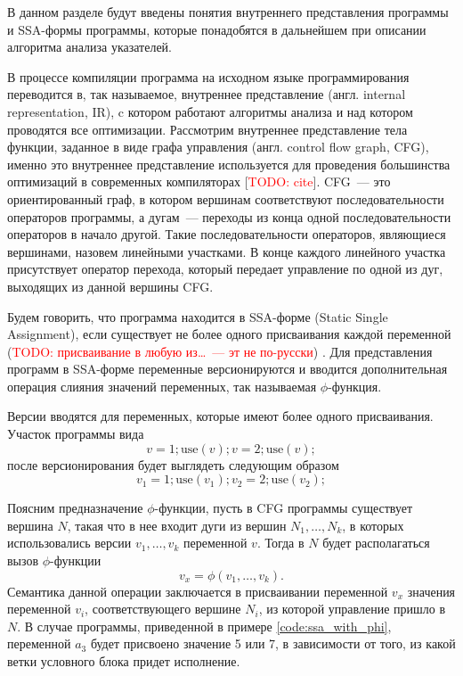 \documentclass[14pt,titlepage]{extarticle}
\let\oldphi\phi
\renewcommand{\phi}{\ensuremath{\oldphi}}
\newcommand{\todo}[1]{\textcolor{red}{\eng{TODO}: #1}}
\newcommand{\todocite}{[\todo{cite}]}
\newcommand{\eng}[1]{{\English#1}}
\begin{document}
    В данном разделе будут введены понятия внутреннего представления программы
    и SSA-формы программы, которые понадобятся в дальнейшем при описании
    алгоритма анализа указателей.

    В процессе компиляции программа на исходном языке программирования
    переводится в, так называемое, внутреннее представление
    (англ. \eng{internal representation, IR}), c котором работают
    алгоритмы анализа и над котором проводятся все оптимизации.
    Рассмотрим внутреннее представление тела функции, заданное в виде
    графа управления (англ. \eng{control flow graph, CFG}), именно это
    внутреннее представление используется для проведения большинства
    оптимизаций в современных компиляторах \todocite.
    CFG~--- это ориентированный граф, в котором вершинам соответствуют
    последовательности операторов программы, а дугам~--- переходы из конца
    одной последовательности операторов в начало другой. Такие
    последовательности операторов, являющиеся вершинами, назовем линейными
    участками. В конце каждого линейного участка присутствует оператор
    перехода, который передает управление по одной из дуг, выходящих из
    данной вершины CFG.

    Будем говорить, что программа находится в SSA-форме (\eng{Static Single
    Assignment}), если существует не более одного присваивания каждой
    переменной (\todo{присваивание в любую из\ldots~--- эт не по-русски})
    \cite{ssa}.
    Для представления программ в SSA-форме переменные версионируются и
    вводится дополнительная операция слияния значений переменных, так
    называемая \phi-функция.

    Версии вводятся для переменных, которые имеют более одного присваивания.
    Участок программы вида
    \[ v = 1; \textrm{use}(v); v = 2; \textrm{use}(v); \]
    после версионирования будет выглядеть следующим образом
    \[ v_1 = 1; \textrm{use}(v_1); v_2 = 2; \textrm{use}(v_2); \]

    Поясним предназначение \phi-функции, пусть в CFG программы существует
    вершина $N$, такая что в нее входит дуги из вершин $N_1, \ldots, N_k$, в
    которых использовались версии $v_1, \ldots, v_k$ переменной $v$. Тогда в
    $N$ будет располагаться вызов \phi-функции
    \[ v_x = \phi(v_1, \ldots, v_k). \]
    Семантика данной операции заключается в присваивании переменной $v_x$
    значения переменной $v_i$, соответствующего вершине $N_i$, из которой
    управление пришло в $N$. В случае программы, приведенной в примере
    \ref{code:ssa_with_phi}, переменной $a_3$ будет присвоено значение 5 или
    7, в зависимости от того, из какой ветки условного блока придет исполнение.
\end{document}
